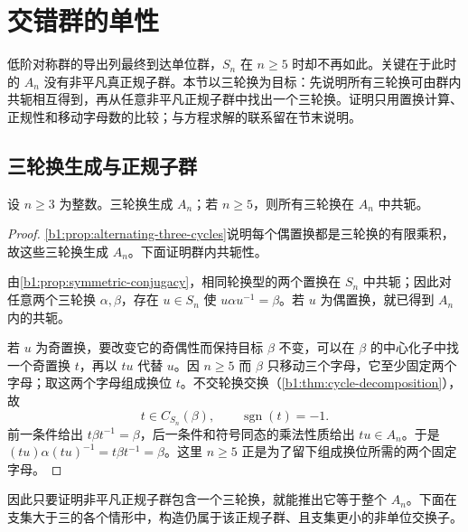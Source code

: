 
\section{交错群的单性}
\label{b1:sec:0704}

低阶对称群的导出列最终到达单位群，\(S_n\) 在 \(n\ge5\) 时却不再如此。关键在于此时的 \(A_n\) 没有非平凡真正规子群。本节以三轮换为目标：先说明所有三轮换可由群内共轭相互得到，再从任意非平凡正规子群中找出一个三轮换。证明只用置换计算、正规性和移动字母数的比较；与方程求解的联系留在节末说明。

%
%
%

\subsection{三轮换生成与正规子群}
\label{b1:subsec:0704:01}

\begin{lemma}[三轮换的生成与共轭性]\label{b1:lem:three-cycles-generate}
	设 \(n\geq3\) 为整数。三轮换生成 \(A_n\)；若 \(n\geq5\)，则所有三轮换在 \(A_n\) 中共轭。
\end{lemma}

\begin{proof}
	\cref{b1:prop:alternating-three-cycles}说明每个偶置换都是三轮换的有限乘积，故这些三轮换生成 \(A_n\)。下面证明群内共轭性。

	由\cref{b1:prop:symmetric-conjugacy}，相同轮换型的两个置换在 \(S_n\) 中共轭；因此对任意两个三轮换 \(\alpha,\beta\)，存在 \(u\in S_n\) 使 \(u\alpha u^{-1}=\beta\)。若 \(u\) 为偶置换，就已得到 \(A_n\) 内的共轭。

	若 \(u\) 为奇置换，要改变它的奇偶性而保持目标 \(\beta\) 不变，可以在 \(\beta\) 的中心化子中找一个奇置换 \(t\)，再以 \(tu\) 代替 \(u\)。因 \(n\ge5\) 而 \(\beta\) 只移动三个字母，它至少固定两个字母；取这两个字母组成换位 \(t\)。不交轮换交换（\cref{b1:thm:cycle-decomposition}），故
	\[
		t\in C_{S_n}(\beta),\qquad \operatorname{sgn}(t)=-1.
	\]
	前一条件给出 \(t\beta t^{-1}=\beta\)，后一条件和符号同态的乘法性质给出 \(tu\in A_n\)。于是 \((tu)\alpha(tu)^{-1}=t\beta t^{-1}=\beta\)。这里 \(n\ge5\) 正是为了留下组成换位所需的两个固定字母。
\end{proof}

因此只要证明非平凡正规子群包含一个三轮换，就能推出它等于整个 \(A_n\)。下面在支集大于三的各个情形中，构造仍属于该正规子群、且支集更小的非单位交换子。

